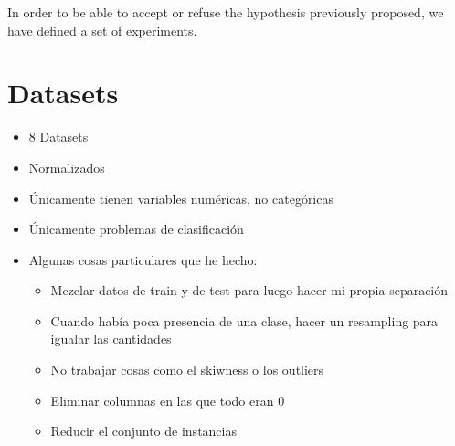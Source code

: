 \begin{pre-delivery}
  In order to be able to accept or refuse the hypothesis previously proposed, we
  have defined a set of experiments.
\end{pre-delivery}

\section{Datasets}
\begin{note}
  \begin{itemize}
    \item 8 Datasets
    \item Normalizados
    \item Únicamente tienen variables numéricas, no categóricas
    \item Únicamente problemas de clasificación
    \item Algunas cosas particulares que he hecho:
    \begin{itemize}
      \item Mezclar datos de train y de test para luego hacer mi propia
      separación
      \item Cuando había poca presencia de una clase, hacer un resampling para
      igualar las cantidades
      \item No trabajar cosas como el skiwness o los outliers
      \item Eliminar columnas en las que todo eran 0
      \item Reducir el conjunto de instancias
    \end{itemize}
  \end{itemize}
\end{note}
